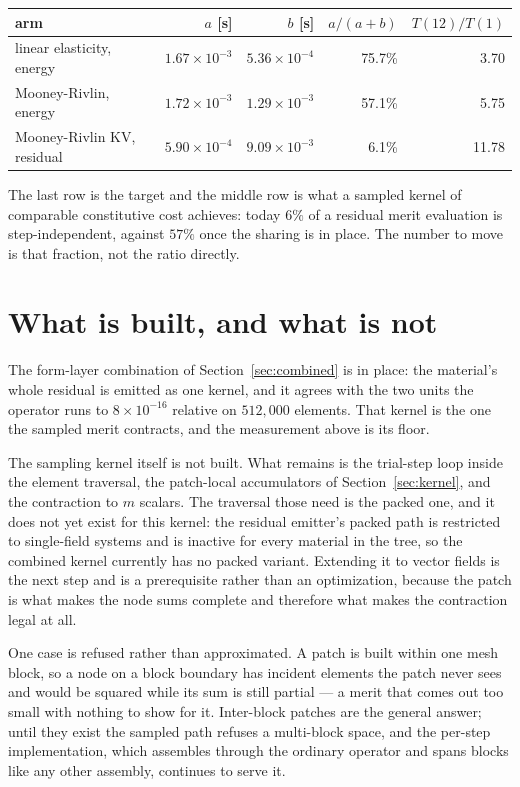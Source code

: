 \documentclass[11pt]{article}
\begin{document}
\begin{center}
\begin{tabular}{lrrrr}
\toprule
arm & $a$ [s] & $b$ [s] & $a/(a{+}b)$ & $T(12)/T(1)$ \\
\midrule
linear elasticity, energy   & $1.67\times10^{-3}$ & $5.36\times10^{-4}$ & 75.7\% & 3.70 \\
Mooney-Rivlin, energy       & $1.72\times10^{-3}$ & $1.29\times10^{-3}$ & 57.1\% & 5.75 \\
Mooney-Rivlin KV, residual  & $5.90\times10^{-4}$ & $9.09\times10^{-3}$ & 6.1\%  & 11.78 \\
\bottomrule
\end{tabular}
\end{center}

The last row is the target and the middle row is what a sampled kernel of
comparable constitutive cost achieves: today $6\%$ of a residual merit
evaluation is step-independent, against $57\%$ once the sharing is in place.
The number to move is that fraction, not the ratio directly.

\section{What is built, and what is not}

The form-layer combination of Section~\ref{sec:combined} is in place: the
material's whole residual is emitted as one kernel, and it agrees with the two
units the operator runs to $8\times10^{-16}$ relative on $512{,}000$ elements.
That kernel is the one the sampled merit contracts, and the measurement above is
its floor.

The sampling kernel itself is not built.  What remains is the trial-step loop
inside the element traversal, the patch-local accumulators of
Section~\ref{sec:kernel}, and the contraction to $m$ scalars.  The traversal
those need is the packed one, and it does not yet exist for this kernel: the
residual emitter's packed path is restricted to single-field systems and is
inactive for every material in the tree, so the combined kernel currently has no
packed variant.  Extending it to vector fields is the next step and is a
prerequisite rather than an optimization, because the patch is what makes the
node sums complete and therefore what makes the contraction legal at all.

One case is refused rather than approximated.  A patch is built within one mesh
block, so a node on a block boundary has incident elements the patch never sees
and would be squared while its sum is still partial --- a merit that comes out
too small with nothing to show for it.  Inter-block patches are the general
answer; until they exist the sampled path refuses a multi-block space, and the
per-step implementation, which assembles through the ordinary operator and spans
blocks like any other assembly, continues to serve it.
\end{document}
